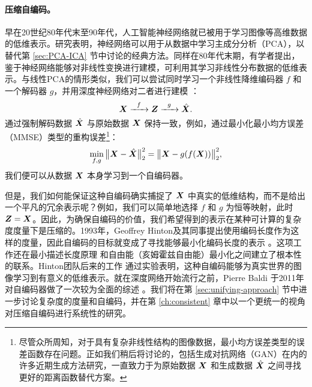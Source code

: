 \documentclass[../../book-main_zh.tex]{subfiles}
\begin{document}
\paragraph{压缩自编码。}

早在20世纪80年代末至90年代，人工智能神经网络就已被用于学习图像等高维数据的低维表示。研究表明，神经网络可以用于从数据中学习主成分分析（PCA）\cite{Oja1982SimplifiedNM,Baldi89}，以替代第 \ref{sec:PCA-ICA} 节中讨论的经典方法。同样在80年代末期，有学者提出，鉴于神经网络能够对非线性变换进行建模，可利用其学习非线性分布数据的低维表示。与线性PCA的情形类似，我们可以尝试同时学习一个非线性降维编码器 $f$ 和一个解码器 $g$，并用深度神经网络对二者进行建模 \cite{Rumelhart1986,Kramer1991NonlinearPC}：
\begin{equation}
    \bm{X}   \xrightarrow{\hspace{2mm} f \hspace{2mm}} \bm{Z}  \xrightarrow{\hspace{2mm} g \hspace{2mm}} \hat {\bm{X}}.
       \label{eqn:auto-encoding-deep-networks}
\end{equation}
通过强制解码数据 $\hat {\bm{X}}$ 与原始数据 $\bm{X}$ 保持一致，例如，通过最小化最小均方误差（MMSE）类型的重构误差\footnote{尽管众所周知，对于具有复杂非线性结构的图像数据，最小均方误差类型的误差函数存在问题。正如我们稍后将讨论的，包括生成对抗网络（GAN）在内的许多近期生成方法研究，一直致力于为原始数据 $\bm{X}$ 和生成数据 $\hat {\bm{X}}$ 之间寻找更好的距离函数替代方案。}：
\begin{equation}
    \min_{f,g} \big\|\bm{X} - \hat {\bm{X}}\big\|_2^2 = \big\|\bm{X} - g(f( \bm{X}))\big\|_2^2,
\end{equation}
我们便可以从数据 $\bm{X}$ 本身学习到一个自编码器。

但是，我们如何能保证这种自编码确实捕捉了 $\bm{X}$ 中真实的低维结构，而不是给出一个平凡的冗余表示呢？例如，我们可以简单地选择 $f$ 和 $g$ 为恒等映射，此时 $\bm{Z} = \bm{X}$。因此，为确保自编码的价值，我们希望得到的表示在某种可计算的复杂度度量下是压缩的。1993年，Geoffrey Hinton及其同事提出使用编码长度作为这样的度量，因此自编码的目标就变成了寻找能够最小化编码长度的表示 \cite{Hinton-1993}。这项工作还在最小描述长度原理 \cite{Rissanen-1978} 和自由能（亥姆霍兹自由能）最小化之间建立了根本性的联系。Hinton团队后来的工作 \cite{Hinton504} 通过实验表明，这种自编码能够为真实世界的图像学习到有意义的低维表示。就在深度网络开始流行之前，Pierre Baldi 于2011年对自编码器做了一次较为全面的综述 \cite{Baldi2011}。我们将在第 \ref{sec:unifying-approach} 节中进一步讨论复杂度的度量和自编码，并在第 \ref{ch:consistent} 章中以一个更统一的视角对压缩自编码进行系统性的研究。
\end{document}
